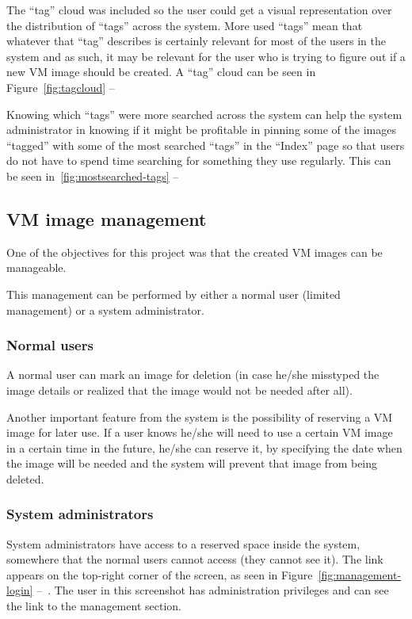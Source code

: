 The ``tag'' cloud was included so the user could get a visual representation over the distribution of ``tags'' across the system. More used ``tags'' mean that whatever that ``tag'' describes is certainly relevant for most of the users in the system and as such, it may be relevant for the user who is trying to figure out if a new VM image should be created.
A ``tag'' cloud can be seen in Figure~\ref{fig:tagcloud} --~

Knowing which ``tags'' were more searched across the system can help the system administrator in knowing if it might be profitable in pinning some of the images ``tagged'' with some of the most searched ``tags'' in the ``Index'' page so that users do not have to spend time searching for something they use regularly.
This can be seen in~\ref{fig:mostsearched-tags} --~

\subsection{VM image management}\label{subsec:vm-manag}

One of the objectives for this project was that the created VM images can be manageable.

This management can be performed by either a normal user (limited management) or a system administrator.

\subsubsection{Normal users}

A normal user can mark an image for deletion (in case he/she misstyped the image details or realized that the image would not be needed after all).

Another important feature from the system is the possibility of reserving a VM image for later use. If a user knows he/she will need to use a certain VM image in a certain time in the future, he/she can reserve it, by specifying the date when the image will be needed and the system will prevent that image from being deleted.

\subsubsection{System administrators}

System administrators have access to a reserved space inside the system, somewhere that the normal users cannot access (they cannot see it). 
The link appears on the top-right corner of the screen, as seen in Figure~\ref{fig:management-login} --~. The user in this screenshot has administration privileges and can see the link to the management section.

